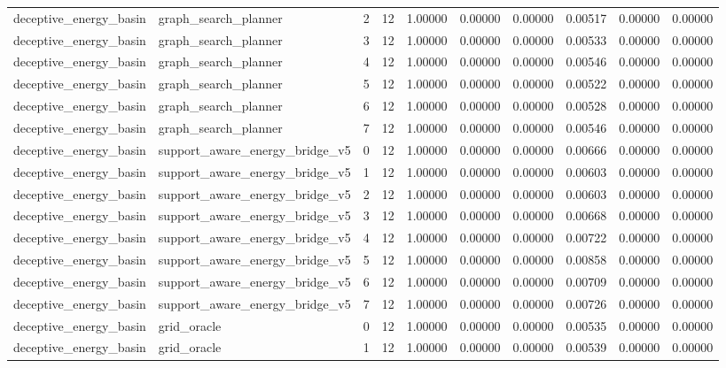 \documentclass{article}
\begin{document}
\begin{table}[tbp]
{\begin{tabular}{llllllllll}
deceptive\_energy\_basin & graph\_search\_planner & 2 & 12 & 1.00000 & 0.00000 & 0.00000 & 0.00517 & 0.00000 & 0.00000 \\
deceptive\_energy\_basin & graph\_search\_planner & 3 & 12 & 1.00000 & 0.00000 & 0.00000 & 0.00533 & 0.00000 & 0.00000 \\
deceptive\_energy\_basin & graph\_search\_planner & 4 & 12 & 1.00000 & 0.00000 & 0.00000 & 0.00546 & 0.00000 & 0.00000 \\
deceptive\_energy\_basin & graph\_search\_planner & 5 & 12 & 1.00000 & 0.00000 & 0.00000 & 0.00522 & 0.00000 & 0.00000 \\
deceptive\_energy\_basin & graph\_search\_planner & 6 & 12 & 1.00000 & 0.00000 & 0.00000 & 0.00528 & 0.00000 & 0.00000 \\
deceptive\_energy\_basin & graph\_search\_planner & 7 & 12 & 1.00000 & 0.00000 & 0.00000 & 0.00546 & 0.00000 & 0.00000 \\
deceptive\_energy\_basin & support\_aware\_energy\_bridge\_v5 & 0 & 12 & 1.00000 & 0.00000 & 0.00000 & 0.00666 & 0.00000 & 0.00000 \\
deceptive\_energy\_basin & support\_aware\_energy\_bridge\_v5 & 1 & 12 & 1.00000 & 0.00000 & 0.00000 & 0.00603 & 0.00000 & 0.00000 \\
deceptive\_energy\_basin & support\_aware\_energy\_bridge\_v5 & 2 & 12 & 1.00000 & 0.00000 & 0.00000 & 0.00603 & 0.00000 & 0.00000 \\
deceptive\_energy\_basin & support\_aware\_energy\_bridge\_v5 & 3 & 12 & 1.00000 & 0.00000 & 0.00000 & 0.00668 & 0.00000 & 0.00000 \\
deceptive\_energy\_basin & support\_aware\_energy\_bridge\_v5 & 4 & 12 & 1.00000 & 0.00000 & 0.00000 & 0.00722 & 0.00000 & 0.00000 \\
deceptive\_energy\_basin & support\_aware\_energy\_bridge\_v5 & 5 & 12 & 1.00000 & 0.00000 & 0.00000 & 0.00858 & 0.00000 & 0.00000 \\
deceptive\_energy\_basin & support\_aware\_energy\_bridge\_v5 & 6 & 12 & 1.00000 & 0.00000 & 0.00000 & 0.00709 & 0.00000 & 0.00000 \\
deceptive\_energy\_basin & support\_aware\_energy\_bridge\_v5 & 7 & 12 & 1.00000 & 0.00000 & 0.00000 & 0.00726 & 0.00000 & 0.00000 \\
deceptive\_energy\_basin & grid\_oracle & 0 & 12 & 1.00000 & 0.00000 & 0.00000 & 0.00535 & 0.00000 & 0.00000 \\
deceptive\_energy\_basin & grid\_oracle & 1 & 12 & 1.00000 & 0.00000 & 0.00000 & 0.00539 & 0.00000 & 0.00000 \\

\end{tabular}}
\end{table}
\end{document}
